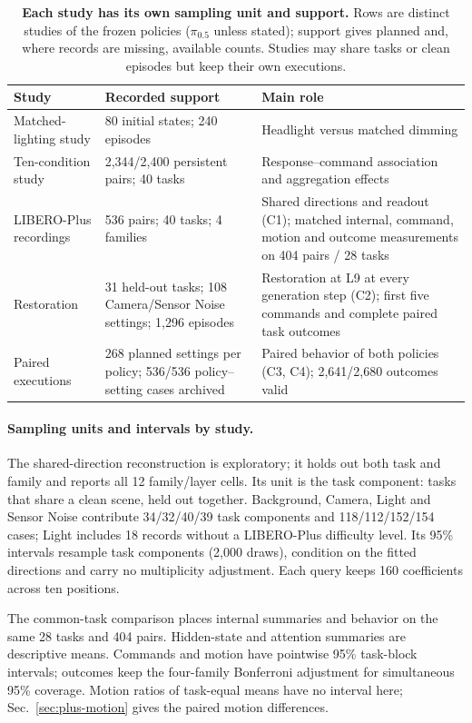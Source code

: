 \begin{table}[t]
\centering\small
\caption{\textbf{Each study has its own sampling unit and support.} Rows are distinct studies of the frozen policies ($\pi_{0.5}$ unless stated); support gives planned and, where records are missing, available counts. Studies may share tasks or clean episodes but keep their own executions.}
\label{tab:cohorts}
\setlength{\tabcolsep}{4pt}
\begin{tabular}{p{}p{}p{}}
\toprule
Study & Recorded support & Main role\\
\midrule
Matched-lighting study & 80 initial states; 240 episodes & Headlight versus matched dimming\\
Ten-condition study & 2,344/2,400 persistent pairs; 40 tasks & Response--command association and aggregation effects\\
LIBERO-Plus recordings & 536 pairs; 40 tasks; 4 families & Shared directions and readout (C1); matched internal, command, motion and outcome measurements on 404 pairs / 28 tasks\\
Restoration & 31 held-out tasks; 108 Camera/Sensor Noise settings; 1,296 episodes & Restoration at L9 at every generation step (C2); first five commands and complete paired task outcomes\\
Paired executions & 268 planned settings per policy; 536/536 policy--setting cases archived & Paired behavior of both policies (C3, C4); 2,641/2,680 outcomes valid\\
\bottomrule
\end{tabular}
\end{table}
\paragraph{Sampling units and intervals by study.}
The shared-direction reconstruction is exploratory; it holds out both task and family and reports all 12 family/layer cells. Its unit is the task component: tasks that share a clean scene, held out together. Background, Camera, Light and Sensor Noise contribute 34/32/40/39 task components and 118/112/152/154 cases; Light includes 18 records without a LIBERO-Plus difficulty level. Its 95\% intervals resample task components (2,000 draws), condition on the fitted directions and carry no multiplicity adjustment. Each query keeps 160 coefficients across ten positions.

The common-task comparison places internal summaries and behavior on the same 28 tasks and 404 pairs. Hidden-state and attention summaries are descriptive means. Commands and motion have pointwise 95\% task-block intervals; outcomes keep the four-family Bonferroni adjustment for simultaneous 95\% coverage. Motion ratios of task-equal means have no interval here; Sec.~\ref{sec:plus-motion} gives the paired motion differences.

